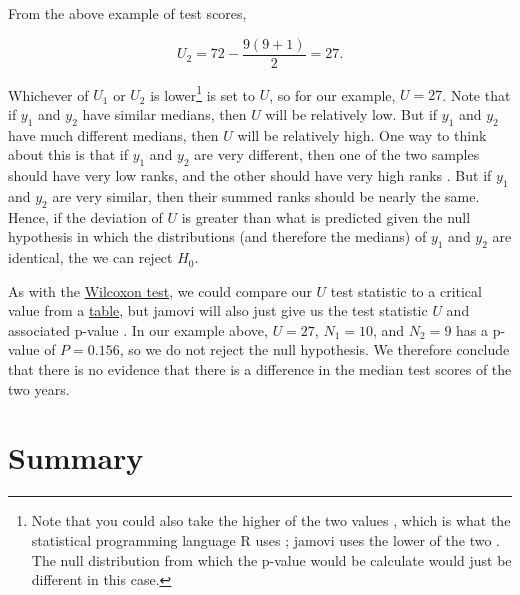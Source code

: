 \documentclass[
]{scrbook}
\begin{document}
From the above example of test scores,

\[U_{2} = 72 - \frac{9\left(9 + 1 \right)}{2} = 27.\]

Whichever of \(U_{1}\) or \(U_{2}\) is lower\footnote{Note that you could also take the higher of the two values \citep{Sokal1995}, which is what the statistical programming language R uses \citep{Rproject}; jamovi uses the lower of the two \citep{Jamovi2022}. The null distribution from which the p-value would be calculate would just be different in this case.} is set to \(U\), so for our example, \(U = 27\).
Note that if \(y_{1}\) and \(y_{2}\) have similar medians, then \(U\) will be relatively low.
But if \(y_{1}\) and \(y_{2}\) have much different medians, then \(U\) will be relatively high.
One way to think about this is that if \(y_{1}\) and \(y_{2}\) are very different, then one of the two samples should have very low ranks, and the other should have very high ranks \citep{Sokal1995}.
But if \(y_{1}\) and \(y_{2}\) are very similar, then their summed ranks should be nearly the same.
Hence, if the deviation of \(U\) is greater than what is predicted given the null hypothesis in which the distributions (and therefore the medians) of \(y_{1}\) and \(y_{2}\) are identical, the we can reject \(H_{0}\).

As with the \protect\hyperlink{wilcoxon-test}{Wilcoxon test}, we could compare our \(U\) test statistic to a critical value from a \protect\hyperlink{mann-whitney-u-critical-values}{table}, but jamovi will also just give us the test statistic \(U\) and associated p-value \citep{Jamovi2022}.
In our example above, \(U = 27\), \(N_{1} = 10\), and \(N_{2} = 9\) has a p-value of \(P = 0.156\), so we do not reject the null hypothesis.
We therefore conclude that there is no evidence that there is a difference in the median test scores of the two years.

\hypertarget{summary-3}{%
\section{Summary}\label{summary-3}}
\end{document}
